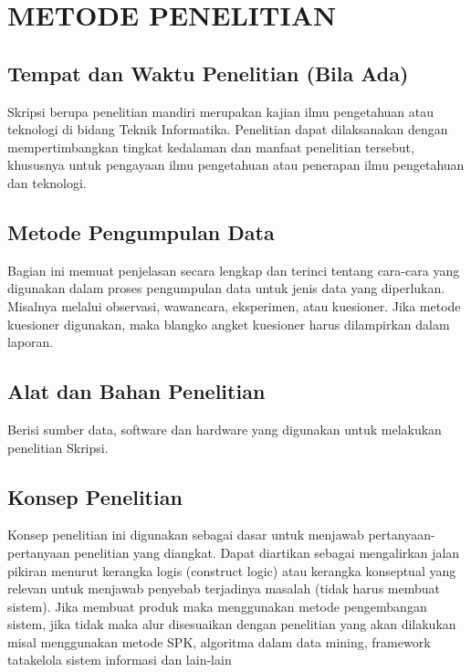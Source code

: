 \chapter{METODE PENELITIAN}

\section{Tempat dan Waktu Penelitian (Bila Ada)}
\begin{isi}
Skripsi berupa penelitian mandiri merupakan kajian ilmu
pengetahuan atau teknologi di bidang Teknik Informatika.
Penelitian dapat dilaksanakan dengan mempertimbangkan tingkat
kedalaman dan manfaat penelitian tersebut, khususnya untuk
pengayaan ilmu pengetahuan atau penerapan ilmu pengetahuan dan
teknologi.
\end{isi}

\section{Metode Pengumpulan Data}
\begin{isi}
Bagian ini memuat penjelasan secara lengkap dan terinci tentang
cara-cara yang digunakan dalam proses pengumpulan data untuk jenis
data yang diperlukan. Misalnya melalui observasi, wawancara,
eksperimen, atau kuesioner. Jika metode kuesioner digunakan, maka
blangko angket kuesioner harus dilampirkan dalam laporan.
\end{isi}

\section{Alat dan Bahan Penelitian}
\begin{isi}
Berisi sumber data, software dan hardware yang digunakan untuk
melakukan penelitian Skripsi.
\end{isi}

\section{Konsep Penelitian}
\begin{isi}
Konsep penelitian ini digunakan sebagai dasar untuk menjawab
pertanyaan-pertanyaan penelitian yang diangkat. Dapat diartikan
sebagai mengalirkan jalan pikiran menurut kerangka logis
(construct logic) atau kerangka konseptual yang relevan
untuk menjawab penyebab terjadinya masalah (tidak harus membuat
sistem). Jika membuat produk maka menggunakan metode pengembangan
sistem, jika tidak maka alur disesuaikan dengan penelitian yang
akan dilakukan misal menggunakan metode SPK, algoritma dalam data
mining, framework tatakelola sistem informasi dan lain-lain
\end{isi}
